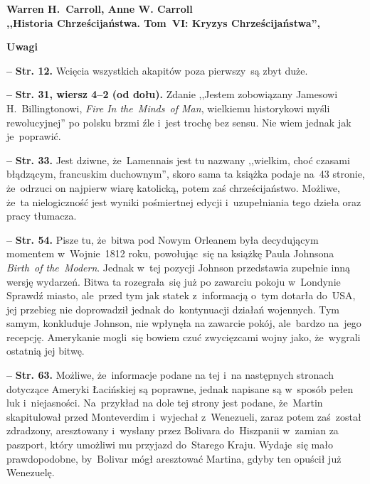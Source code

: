 \documentclass[a4paper,11pt]{article}
\newcommand{\spaceTwo}{2em}
\newcommand{\spaceFour}{0.5em}
\newcommand{\tb}{\textbf}
\newcommand{\noi}{\noindent}
\newcommand{\start}{\noi \tb{--} {}}
\newcommand{\Center}[1]{\begin{center} #1 \end{center}}
\newcommand{\CenterTB}[1]{\Center{\tb{#1}}}
\newcommand{\Str}[1]{\tb{Str. #1.}}
\newcommand{\StrWd}[2]{\tb{Str. #1, wiersz #2 (od dołu).}}
\newcommand{\Work}[1]{ \begin{center} {\large \tb{#1}} \end{center} }
\newcommand{\red}[1]{{\color{red} #1}}
\begin{document}
\vspace{\spaceTwo}





\Work{
  Warren H.~Carroll, Anne W. Carroll \\
  ,,Historia Chrześcijaństwa. Tom~VI: Kryzys Chrześcijaństwa'',
  \cite{CarrollHistoriaChrzecijanstwaTomVI14} }


\CenterTB{Uwagi}

\start \Str{12} Wcięcia wszystkich akapitów poza pierwszy~są zbyt
duże.

\vspace{\spaceFour}


\start \StrWd{31}{4--2} Zdanie ,,Jestem zobowiązany Jamesowi
H.~Billingtonowi, \emph{Fire In the~Minds~of Man}, wielkiemu
historykowi myśli rewolucyjnej'' po polsku brzmi źle i~jest trochę bez
sensu. Nie wiem jednak jak je~poprawić.

\vspace{\spaceFour}


\start \Str{33} Jest dziwne, że~Lamennais jest tu nazwany ,,wielkim,
choć czasami błądzącym, francuskim duchownym'', skoro sama ta książka
podaje na~43 stronie, że~odrzuci on najpierw wiarę katolicką, potem
zaś chrześcijaństwo. Możliwe, że~ta nielogiczność jest wyniki
pośmiertnej edycji i~uzupełniania tego dzieła oraz pracy tłumacza.

\vspace{\spaceFour}


\start \Str{54} Pisze tu, że~bitwa pod Nowym Orleanem była decydującym
momentem w~Wojnie~1812 roku, powołując~się na książkę Paula Johnsona
\emph{Birth~of the~Modern}. Jednak w~tej pozycji Johnson przedstawia
zupełnie inną wersję wydarzeń. Bitwa ta rozegrała~się już po zawarciu
pokoju w~Londynie \red{Sprawdź miasto}, ale~przed tym jak statek
z~informacją o~tym dotarła do~USA, jej przebieg nie doprowadził jednak
do~kontynuacji działań wojennych. Tym samym, konkluduje Johnson, nie
wpłynęła na zawarcie pokój, ale~bardzo na~jego recepcję. Amerykanie
mogli~się bowiem czuć zwycięzcami wojny jako, że~wygrali ostatnią jej
bitwę.

\vspace{\spaceFour}


\start \Str{63} Możliwe, że~informacje podane na tej i~na następnych
stronach dotyczące Ameryki Łacińskiej są poprawne, jednak napisane są
w~sposób pełen luk i~niejasności. Na~przykład na dole tej strony jest
podane, że~Martin skapitulował przed Monteverdim i~wyjechał
z~Wenezueli, zaraz potem zaś~został zdradzony, aresztowany i~wysłany
przez Bolivara do~Hiszpanii w~zamian za paszport, który umożliwi mu
przyjazd do~Starego Kraju. Wydaje~się mało prawdopodobne, by~Bolivar
mógł aresztować Martina, gdyby ten opuścił już Wenezuelę.
\end{document}
